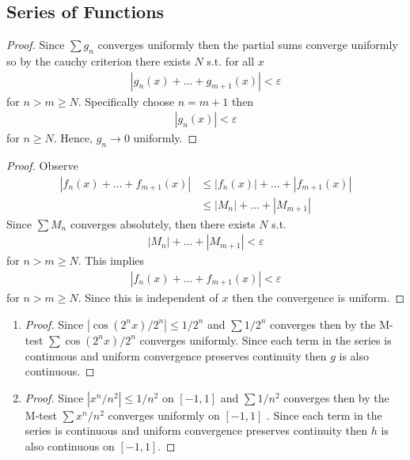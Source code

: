 \subsection{Series of Functions}

\begin{proof}
    Since $\sum g_n$ converges uniformly then the partial sums converge uniformly
    so by the cauchy criterion there exists $N$ s.t. for all $x$
    \begin{align*}
        |g_n(x) + \hdots + g_{m+1}(x)| < \varepsilon
    \end{align*}
    for $n>m\geq N$. Specifically choose $n=m+1$ then 
    \begin{align*}
        |g_n(x)| < \varepsilon
    \end{align*}
    for $n\geq N$. Hence, $g_n \rightarrow 0$ uniformly.
\end{proof}

\begin{proof}
    Observe
    \begin{align*}
        |f_n(x) + \hdots + f_{m+1}(x)| &\leq  |f_n(x)| + \hdots + |f_{m+1}(x)|  \\
                                    &\leq |M_n| + \hdots + |M_{m+1}|
    \end{align*}
    Since $\sum M_n$ converges absolutely, then there exists $N$ s.t. 
    \begin{align*}
        |M_n| + \hdots + |M_{m+1}| < \varepsilon
    \end{align*} 
    for $n>m\geq N$. This implies
    \begin{align*}
        |f_n(x) + \hdots + f_{m+1}(x)| < \varepsilon
    \end{align*}
    for $n>m\geq N$. Since this is independent of $x$ then the convergence 
    is uniform.
\end{proof}

\begin{enumerate}[label=(\alph*)]
    \item 
    \begin{proof}
        Since $|\cos(2^n x)/2^n|\leq 1/2^n$ and $\sum  1/2^n$
        converges then by the M-test $\sum \cos(2^n x)/2^n$ converges 
        uniformly. Since each term in the series is continuous and 
        uniform convergence preserves continuity then $g$ is also 
        continuous.
    \end{proof}

    \item
    \begin{proof}
        Since $|x^n/n^2|\leq 1/n^2$ on $[-1,1]$ and $\sum  1/n^2$
        converges then by the M-test $\sum x^n/n^2$ converges 
        uniformly on $[-1,1]$ . Since each term in the series is continuous and 
        uniform convergence preserves continuity then $h$ is also 
        continuous on $[-1,1]$.
    \end{proof}
\end{enumerate}

